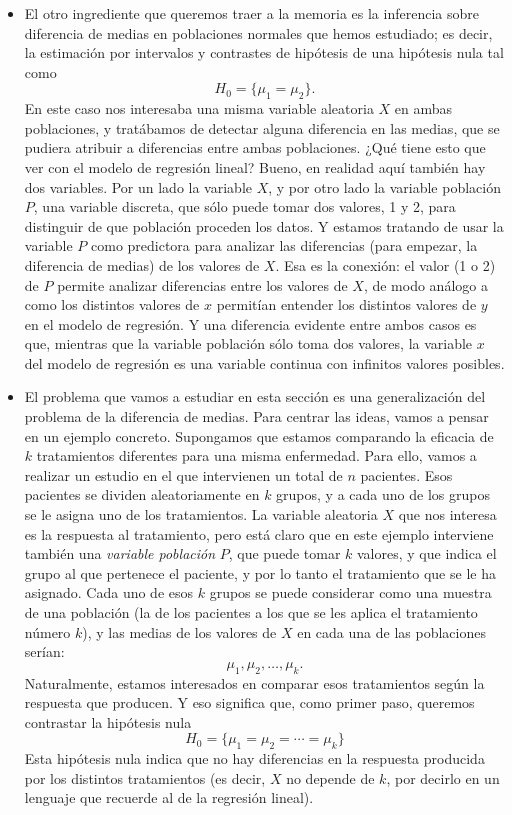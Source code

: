 \begin{itemize}
    \item El otro ingrediente que queremos traer a la memoria es la inferencia sobre diferencia de medias en poblaciones normales que hemos estudiado; es decir, la estimación por intervalos y contrastes de hipótesis de una hipótesis nula tal como
        \[H_0=\{\mu_1=\mu_2\}.\]
        En este caso nos interesaba una misma variable aleatoria $X$ en ambas poblaciones, y tratábamos de detectar alguna diferencia en las medias, que se pudiera atribuir a diferencias entre ambas poblaciones. ¿Qué tiene esto que ver con el modelo de regresión lineal? Bueno, en realidad aquí también hay dos variables. Por un lado la variable $X$, y por otro lado la {\sf variable población} $P$, una variable discreta, que sólo puede tomar dos valores, 1 y 2, para distinguir de que población proceden los datos. Y estamos tratando de usar la variable $P$ como predictora para analizar las diferencias (para empezar, la diferencia de medias) de los valores de $X$. Esa es la conexión: el valor (1 o 2) de $P$ permite analizar diferencias entre los valores de $X$, de modo análogo a como los distintos valores de $x$ permitían entender los distintos valores de $y$ en el modelo de regresión. Y una diferencia evidente entre ambos casos es que, mientras que la variable población sólo toma dos valores, la variable $x$ del modelo de regresión es una variable continua con infinitos valores posibles.

    \item El problema que vamos a estudiar en esta sección es una generalización del problema de la diferencia de medias. Para centrar las ideas, vamos a pensar en un ejemplo concreto. Supongamos que estamos comparando la eficacia de $k$ tratamientos diferentes para una misma enfermedad. Para ello, vamos a realizar un estudio en el que intervienen un total de $n$ pacientes. Esos pacientes se dividen aleatoriamente en $k$ grupos, y a cada uno de los grupos se le asigna uno de los tratamientos. La variable aleatoria $X$ que nos interesa es la respuesta al tratamiento, pero está claro que en este ejemplo interviene también una {\em variable población} $P$, que puede tomar $k$ valores, y que indica el grupo al que pertenece el paciente, y por lo tanto el tratamiento que se le ha asignado. Cada uno de esos $k$ grupos se puede considerar como una muestra de una población (la de los pacientes a los que se les aplica el tratamiento número $k$), y las medias de los valores de $X$ en cada una de las poblaciones serían:
        \[\mu_1,\mu_2,\ldots,\mu_k.\]
        Naturalmente, estamos interesados en comparar esos tratamientos según la respuesta que producen. Y eso significa que, como primer paso, queremos contrastar la hipótesis nula
        \[H_0=\{\mu_1=\mu_2=\cdots=\mu_k\}\]
        Esta hipótesis nula indica que no hay diferencias en la respuesta producida por los distintos tratamientos (es decir, $X$ no depende de $k$, por decirlo en un lenguaje que recuerde al de la regresión lineal).


\end{itemize}
